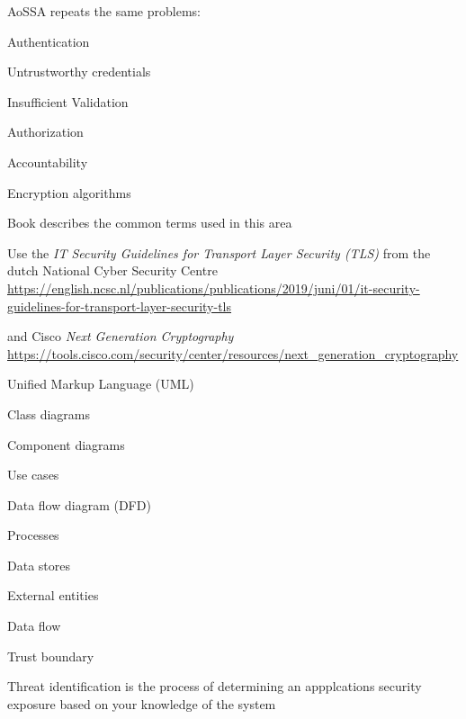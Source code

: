 \documentclass[Screen16to9,17pt]{foils}
\begin{document}

\begin{list2}
\item AoSSA repeats the same problems:
\item Authentication
\item Untrustworthy credentials
\item Insufficient Validation
\item Authorization
\item Accountability
\end{list2}



\begin{list2}
\item Encryption algorithms
\item Book describes the common terms used in this area
\item Use the \emph{IT Security Guidelines for Transport Layer Security (TLS)} from the dutch National Cyber Security Centre\\
{\footnotesize\url{https://english.ncsc.nl/publications/publications/2019/juni/01/it-security-guidelines-for-transport-layer-security-tls}}

\item and Cisco \emph{Next Generation Cryptography}\\
{\footnotesize\url{https://tools.cisco.com/security/center/resources/next_generation_cryptography}}
\end{list2}





\begin{list2}
\item Unified Markup Language (UML)
\item Class diagrams
\item Component diagrams
\item Use cases
\item Data flow diagram (DFD)
\item Processes
\item Data stores
\item External entities
\item Data flow
\item Trust boundary
\item Threat identification is the process of determining an appplcations security exposure based on your knowledge of the system
\end{list2}
\end{document}
